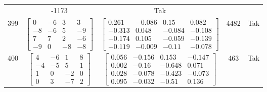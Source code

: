 \documentclass[a4paper,12pt]{article}
\begin{document}
\begin{tabular}{c c c c c}
&
-1173
&
Tak
\\
399
&
$\begin{bmatrix} 0 & -6 & 3 & 3 \\ -8 & -6 & 5 & -9 \\ 7 & 7 & 2 & -6 \\ -9 & 0 & -8 & -8 \end{bmatrix}$
&
$\begin{bmatrix} 0.261 & -0.086 & 0.15 & 0.082 \\ -0.313 & 0.048 & -0.084 & -0.108 \\ -0.174 & 0.105 & -0.059 & -0.139 \\ -0.119 & -0.009 & -0.11 & -0.078 \end{bmatrix}$
&
4482
&
Tak
\\
400
&
$\begin{bmatrix} 4 & -6 & 1 & 8 \\ -4 & -5 & 5 & 1 \\ 1 & 0 & -2 & 0 \\ 0 & 3 & -7 & 2 \end{bmatrix}$
&
$\begin{bmatrix} 0.056 & -0.156 & 0.153 & -0.147 \\ 0.002 & -0.16 & -0.648 & 0.071 \\ 0.028 & -0.078 & -0.423 & -0.073 \\ 0.095 & -0.032 & -0.51 & 0.136 \end{bmatrix}$
&
463
&
Tak
\\
\end{tabular} \egroup \newpage
\end{document}
